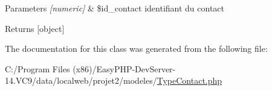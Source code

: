 \begin{DoxyParams}{Parameters}
{\em \mbox{[}numeric\mbox{]}} & \$id\+\_\+contact identifiant du contact \\
\hline
\end{DoxyParams}
\begin{DoxyReturn}{Returns}
\mbox{[}object\mbox{]} 
\end{DoxyReturn}


The documentation for this class was generated from the following file\+:\begin{DoxyCompactItemize}
\item 
C\+:/\+Program Files (x86)/\+Easy\+P\+H\+P-\/\+Dev\+Server-\/14.\+V\+C9/data/localweb/projet2/modeles/\hyperlink{_type_contact_8php}{Type\+Contact.\+php}\end{DoxyCompactItemize}
